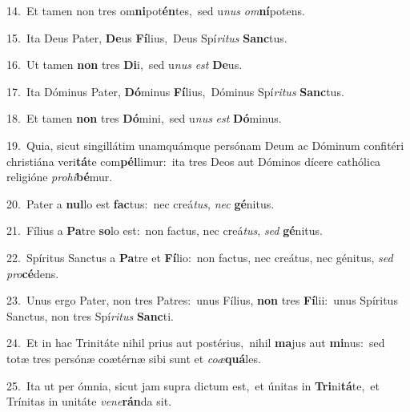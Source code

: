 {\numbfont\textcolor{\numbcolor}{14.}}~Et tamen non tres om\-\textbf{ni}\-pot\-\textbf{én}\-tes,~\star sed u\textit{nus} \textit{om}\-\textbf{ní}potens.\par
{\numbfont\textcolor{\numbcolor}{15.}}~Ita Deus Pater, \textbf{De}\-us \textbf{Fí}\-lius,~\star Deus Spí\-\textit{ri}\-\textit{tus} \textbf{Sanc}\-tus.\par
{\numbfont\textcolor{\numbcolor}{16.}}~Ut tamen \textbf{non} tres \textbf{Di}\-i,~\star sed u\textit{nus} \textit{est} \textbf{De}\-us.\par
{\numbfont\textcolor{\numbcolor}{17.}}~Ita Dóminus Pater, \textbf{Dó}\-minus \textbf{Fí}\-lius,~\star Dóminus Spí\-\textit{ri}\-\textit{tus} \textbf{Sanc}\-tus.\par
{\numbfont\textcolor{\numbcolor}{18.}}~Et tamen \textbf{non} tres \textbf{Dó}\-mini,~\star sed u\textit{nus} \textit{est} \textbf{Dó}\-minus.\par
{\numbfont\textcolor{\numbcolor}{19.}}~Quia, sicut singillátim unamquámque persónam Deum ac Dóminum confitéri christiána veri\-\textbf{tá}\-te com\-\textbf{pél}\-limur:~\star ita tres Deos aut Dóminos dícere cathólica religióne \textit{pro}\-\textit{hi}\textbf{bé}mur.\par
{\numbfont\textcolor{\numbcolor}{20.}}~Pater a \textbf{nul}\-lo est \textbf{fac}\-tus:~\star nec creá\-\textit{tus}\-, \textit{nec} \textbf{gé}\-nitus.\par
{\numbfont\textcolor{\numbcolor}{21.}}~Fílius a \textbf{Pa}\-tre \textbf{so}\-lo est:~\star non factus, nec creá\-\textit{tus}\-, \textit{sed} \textbf{gé}\-nitus.\par
{\numbfont\textcolor{\numbcolor}{22.}}~Spíritus Sanctus a \textbf{Pa}\-tre et \textbf{Fí}\-lio:~\star non factus, nec creátus, nec génitus, \textit{sed} \textit{pro}\-\textbf{cé}dens.\par
{\numbfont\textcolor{\numbcolor}{23.}}~Unus ergo Pater, non tres Patres:~\dagger unus Fílius, \textbf{non} tres \textbf{Fí}\-lii:~\star unus Spíritus Sanctus, non tres Spí\-\textit{ri}\-\textit{tus} \textbf{Sanc}\-ti.\par
{\numbfont\textcolor{\numbcolor}{24.}}~Et in hac Trinitáte nihil prius aut postérius,~\dagger nihil \textbf{ma}\-jus aut \textbf{mi}\-nus:~\star sed totæ tres persónæ coætérnæ sibi sunt et \textit{co}\-\textit{æ}\textbf{quá}les.\par
{\numbfont\textcolor{\numbcolor}{25.}}~Ita ut per ómnia, sicut jam supra dictum est,~\dagger et únitas in \textbf{Tri}\-ni\-\textbf{tá}\-te,~\star et Trínitas in unitáte \textit{ve}\-\textit{ne}\textbf{rán}da sit.\par

